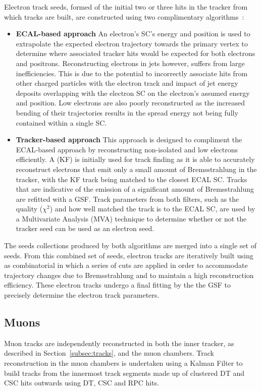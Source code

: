 Electron track seeds, formed of the initial two or three hits in the tracker from which tracks are built,  are constructed using two complimentary algorithms~\cite{Khachatryan:2015hwa}:
\begin{itemize}
\item \textbf{ECAL-based approach} An electron's SC's energy and position is used to extrapolate the expected electron trajectory towards the primary vertex to determine where associated tracker hits would be expected for both electrons and positrons.
Reconstructing electrons in jets however, suffers from large inefficiencies. 
This is due to the potential to incorrectly associate hits from other charged particles with the electron track and impact of jet energy deposits overlapping with the electron SC on the electron's assumed energy and position.
Low \pT electrons are also poorly reconstructed as the increased bending of their trajectories results in the spread energy not being fully contained within a single SC.

\item \textbf{Tracker-based approach} This approach is designed to compliment the ECAL-based approach by reconstructing non-isolated and low \pT electrons efficiently.
A \KF (KF) is initially used for track finding as it is able to accurately reconstruct electrons that emit only a small amount of Bremsstrahlung in the tracker, with the KF track being matched to the closest ECAL SC.
Tracks that are indicative of the emission of a significant amount of Bremsstrahlung are refitted with a GSF.
Track parameters from both filters, such as the quality ($\chi^{2}$) and how well matched the track is to the ECAL SC, are used by a Multivariate Analysis (MVA) technique to determine whether or not the tracker seed can be used as an electron seed.
\end{itemize}

The seeds collections produced by both algorithms are merged into a single set of seeds.
From this combined set of seeds, electron tracks are iteratively built using as combinatorial \KF in which a series of cuts are applied in order to accommodate trajectory changes due to Bremsstrahlung and to maintain a high reconstruction efficiency.
These electron tracks undergo a final fitting by the the GSF to precisely determine the electron track parameters.

\subsection{Muons}\label{subsec:objReco-muons}
Muon tracks are independently reconstructed in both the inner tracker, as described in Section~\ref{subsec:tracks}, and the muon chambers.
Track reconstruction in the muon chambers is undertaken using a Kalman Filter to build tracks from the innermost track segments made up of clustered DT and CSC hits outwards using DT, CSC and RPC hits.

